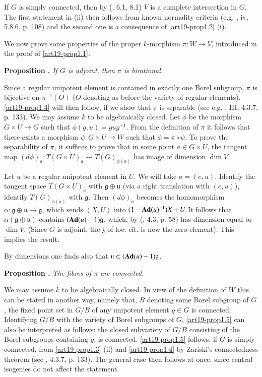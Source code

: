 If $G$ is simply connected, then by (\cite{art19-key15}, 6.1, 8.1) $V$ is a complete intersection in $G$. The first statement in (ii) then follows from known normality criteria (e.g. \cite{art19-key7}, iv, 5.8.6, p. 108) and the second one is a consequence of \ref{art19-prop1.2} (i).

We now prove some properties of the proper $k$-morphism $\pi:W\to V$, introduced in the proof of \ref{art19-prop1.1}.

\medskip
\noindent
{\bf Proposition .\label{art19-prop1.4}}
{\em If $G$ is adjoint, then $\pi$ is birational.}
\smallskip

Since a regular unipotent element is contained in exactly one Borel subgroup, $\pi$ is bijective on $\pi^{-1}(O)$ ($O$ denoting as before the variety of regular elements). \ref{art19-prop1.4} will then follow, if we show that $\pi$ is separable (see e.g. \cite{art19-key7}, III, 4.3.7, p. 133). We may assume $k$ to be algebraically closed. Let $\phi$ be the morphism $G\times U\to G$ such that $\phi(g,u)=gug^{-1}$. From the definition of $\pi$ it follows that there exists a morphism $\psi : G\times U\to W$ such that $\phi=\pi\circ\psi$. To prove the separability of $\pi$, it suffices to prove that in some point $a\in G\times U$, the tangent map $(d\phi)_{a}:T(G\times U)_{a}\to T(G)_{\phi(a)}$ has image of dimension $\dim V$.

Let $u$ be a regular unipotent element in $U$. We will take $a=(e,u)$. Identify the tangent space $T(G\times U)_{a}$ with $\mathfrak{g}\oplus \mathfrak{u}$ (via a right translation with $(e,u)$), identify $T(G)_{\phi(a)}$ with $\mathfrak{g}$. Then $(d\phi)_{a}$ becomes the homomorphism $\alpha :\mathfrak{g}\oplus \mathfrak{u}\to \mathfrak{g}$, which sends $(X,U)$ into $(1-\mathbf{Ad}(u)^{-1})X+U$.\pageoriginale It follows that $\alpha(\mathfrak{g}\oplus \mathfrak{u})$ contains $(\mathbf{Ad} (u)-1)\mathfrak{g}$, which, by (\cite{art19-key15}, 4.3, p. 58) has dimension equal to $\dim V$. (Since $G$ is adjoint, the $\mathfrak{z}$ of loc. cit. is now the zero element). This implies the result.

\begin{remark*}
By dimensions one finds also that $\mathfrak{u}\subset (\mathbf{Ad} (u)-1)\mathfrak{g}$.
\end{remark*}

\medskip
\noindent
{\bf Proposition .\label{art19-prop1.5}}
{\em The fibres of $\pi$ are connected.}
\smallskip

We may assume $k$ to be algebraically closed. In view of the definition of $W$ this can be stated in another way, namely that, $B$ denoting some Borel subgroup of $G$, the fixed point set in $G/B$ of any unipotent element $g\in G$ is connected. Identifying $G/B$ with the variety of Borel subgroups of $G$, \ref{art19-prop1.5} can also be interpreted as follows: the closed subvariety of $G/B$ consisting of the Borel subgroups containing $g$, is connected. \ref{art19-prop1.5} follows, if $G$ is simply connected, from \ref{art19-prop1.3} (ii) and \ref{art19-prop1.4} by Zariski's connectedness theorem (see \cite{art19-key7}, 4.3.7, p. 133). The general case then follows at once, since central isogenies do not affect the statement.

